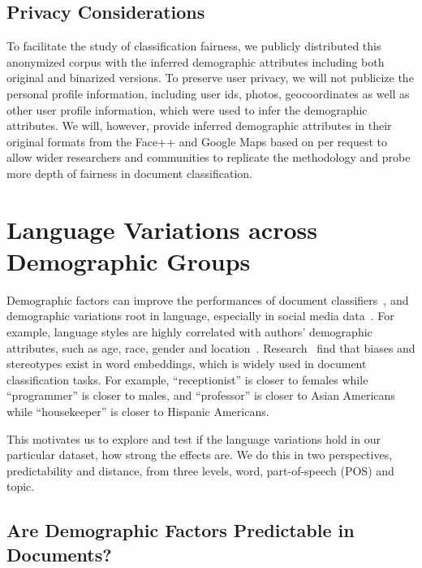 \subsection{Privacy Considerations}
To facilitate the study of classification fairness, we publicly distributed this anonymized corpus with the inferred demographic attributes including both original and binarized versions.
To preserve user privacy, we will not publicize the personal profile information, including user ids, photos, geocoordinates as well as other user profile information, which were used to infer the demographic attributes.
We will, however, provide inferred demographic attributes in their original formats from the Face++ and Google Maps based on per request to allow wider researchers and communities to replicate the methodology and probe more depth of fairness in document classification.


\section{Language Variations across Demographic Groups}
\label{chap5:subsec:analysis}
Demographic factors can improve the performances of document classifiers~\cite{hovy2015demographic}, and demographic variations root in language, especially in social media data~\cite{volkova2013exploring,hovy2015demographic}.
For example, language styles are highly correlated with authors' demographic attributes, such as age, race, gender and location~\cite{coulmas_2017,preoctiuc2018user}. Research~\cite{bolukbasi2016man,zhao2017men,garg2018word} find that biases and stereotypes exist in word embeddings, which is widely used in document classification tasks. For example, ``receptionist'' is closer to females while ``programmer'' is closer to males, and ``professor'' is closer to Asian Americans while ``housekeeper'' is closer to Hispanic Americans.

This motivates us to explore and test if the language variations hold in our particular dataset, how strong the effects are.
We do this in two perspectives, predictability and distance, from three levels, word, part-of-speech (POS) and topic.


\subsection{Are Demographic Factors Predictable in Documents?}
\label{chap5:subsec:pred}

